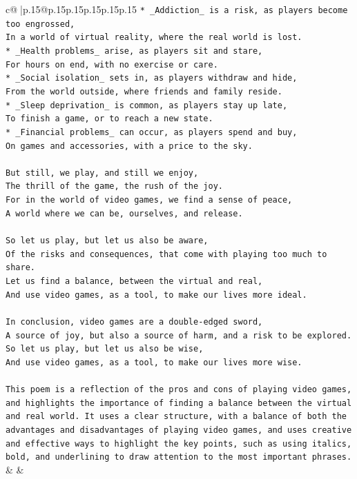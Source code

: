\documentclass{article}
\begin{document}
{\begin{supertabular}{c@{$\;$}|p{.15\linewidth}@{}p{.15\linewidth}p{.15\linewidth}p{.15\linewidth}p{.15\linewidth}p{.15\linewidth}}
{{{\texttt{* \_Addiction\_ is a risk, as players become too engrossed,} \\
\texttt{In a world of virtual reality, where the real world is lost.} \\
\texttt{* \_Health problems\_ arise, as players sit and stare,} \\
\texttt{For hours on end, with no exercise or care.} \\
\texttt{* \_Social isolation\_ sets in, as players withdraw and hide,} \\
\texttt{From the world outside, where friends and family reside.} \\
\texttt{* \_Sleep deprivation\_ is common, as players stay up late,} \\
\texttt{To finish a game, or to reach a new state.} \\
\texttt{* \_Financial problems\_ can occur, as players spend and buy,} \\
\texttt{On games and accessories, with a price to the sky.} \\
\\ 
\texttt{But still, we play, and still we enjoy,} \\
\texttt{The thrill of the game, the rush of the joy.} \\
\texttt{For in the world of video games, we find a sense of peace,} \\
\texttt{A world where we can be, ourselves, and release.} \\
\\ 
\texttt{So let us play, but let us also be aware,} \\
\texttt{Of the risks and consequences, that come with playing too much to share.} \\
\texttt{Let us find a balance, between the virtual and real,} \\
\texttt{And use video games, as a tool, to make our lives more ideal.} \\
\\ 
\texttt{In conclusion, video games are a double{-}edged sword,} \\
\texttt{A source of joy, but also a source of harm, and a risk to be explored.} \\
\texttt{So let us play, but let us also be wise,} \\
\texttt{And use video games, as a tool, to make our lives more wise.} \\
\\ 
\texttt{This poem is a reflection of the pros and cons of playing video games, and highlights the importance of finding a balance between the virtual and real world. It uses a clear structure, with a balance of both the advantages and disadvantages of playing video games, and uses creative and effective ways to highlight the key points, such as using italics, bold, and underlining to draw attention to the most important phrases.} \\
            }
        }
    }
    & & \\ \\


\end{supertabular}}
\end{document}
